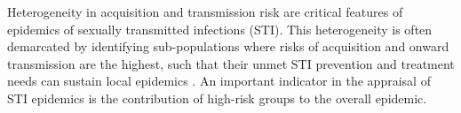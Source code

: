 

Heterogeneity in
acquisition and transmission risk are critical features of 
epidemics of sexually transmitted infections (STI). %
This heterogeneity is often demarcated by identifying
sub-populations where risks of acquisition and onward transmission are the highest,
such that their unmet STI prevention and treatment needs
can sustain local epidemics \citep{Yorke1978,Gesink2011}.		%
An important indicator in the appraisal of STI epidemics is
the contribution of high-risk groups to the overall epidemic.  %

\par  %

